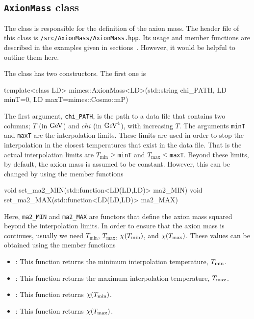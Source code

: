 \documentclass[11pt,a4paper]{article}
\begin{document}
\subsection{{\tt AxionMass} class}
%
The  class is responsible for the definition of the axion mass. The header file of this class is {\tt \mimes/src/AxionMass/AxionMass.hpp}. Its usage and member functions are described in the examples given in sections~. However, it would be helpful to outline them here.

The class has two constructors. The first one is
%
\begin{cpp}
	template<class LD>
	mimes::AxionMass<LD>(std::string chi_PATH, LD minT=0, LD maxT=mimes::Cosmo::mP)
\end{cpp}
%
The first argument, {\tt chi\_PATH}, is the path to a data file that contains two columns; $T$ (in ${\rm GeV}$) and $chi$ (in ${\rm GeV}^4$), with increasing $T$. The arguments {\tt minT} and {\tt maxT} are the interpolation limits. These limits are used in order to stop the interpolation in the closest temperatures that exist in the data file. That is the actual interpolation limits are $T_{\min}\geq${\tt minT} and $T_{\max}\leq${\tt maxT}. Beyond these limits, by default, the axion mass is assumed to be constant. However, this can be changed by using the member functions
%
\begin{cpp}
	void set_ma2_MIN(std::function<LD(LD,LD)> ma2_MIN)
	void set_ma2_MAX(std::function<LD(LD,LD)> ma2_MAX)
\end{cpp}
%
Here, {\tt ma2\_MIN} and {\tt ma2\_MAX} are functors that define the axion mass squared beyond the interpolation limits. In order to ensure that the axion mass is continues, usually we need $T_{\min}$, $T_{\max}$, $\chi(T_{\rm min})$, and $\chi(T_{\rm max})$. These values can be obtained using the member functions
%
\begin{itemize}
	\item {}: This function returns the minimum interpolation temperature, $T_{\rm min}$. 
	\item {}: This function returns the maximum interpolation temperature, $T_{\rm max}$.
	\item {}: This function returns $\chi(T_{\rm min})$.
	\item {}: This function returns $\chi(T_{\rm max})$.
\end{itemize}
\end{document}
